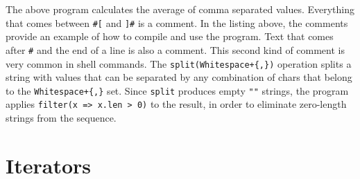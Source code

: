 \documentclass[
  12pt,
]{book}
\begin{document}
The above program calculates the average of comma separated values.
Everything that comes between \texttt{\#{[}} and \texttt{{]}\#} is a
comment. In the listing above, the comments provide an example of how to
compile and use the program. Text that comes after \texttt{\#} and the
end of a line is also a comment. This second kind of comment is very
common in shell commands. The
\texttt{split(Whitespace+\{\textquotesingle{},\textquotesingle{}\})}
operation splits a string with values that can be separated by any
combination of chars that belong to the
\texttt{Whitespace+\{\textquotesingle{},\textquotesingle{}\}} set. Since
\texttt{split} produces empty \texttt{""} strings, the program applies
\texttt{filter(x\ =\textgreater{}\ x.len\ \textgreater{}\ 0)} to the
result, in order to eliminate zero-length strings from the sequence.

\section{Iterators}\label{iterators}
\end{document}
